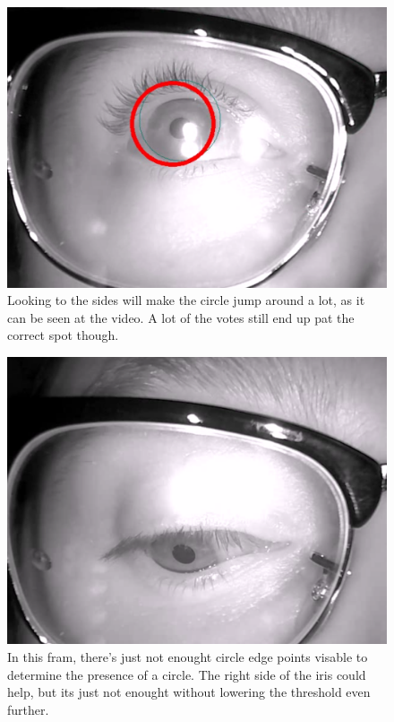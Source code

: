 \begin{figure}[htbp]
\centering
\includegraphics{pics/hough/14.png}
\caption{Looking to the sides will make the circle jump around a lot, as
it can be seen at the video. A lot of the votes still end up pat the
correct spot though. \label{hough14}}
\end{figure}

\begin{figure}[htbp]
\centering
\includegraphics{pics/hough/15.png}
\caption{In this fram, there's just not enought circle edge points
visable to determine the presence of a circle. The right side of the
iris could help, but its just not enought without lowering the threshold
even further. \label{label15}}
\end{figure}

